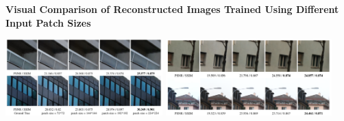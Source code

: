 \documentclass[landscape,a0paper,fontscale=0.292]{baposter}
\begin{document}
\begin{poster}
{    \vspace{0.2em}
    \textbf{Visual Comparison of Reconstructed Images Trained Using Different Input Patch Sizes}
    \vspace{-0.8em}
    \begin{center}
        \includegraphics[width=0.455\textwidth]{images/results}
        \includegraphics[width=0.48\textwidth]{images/results2}
    \end{center}

}
\end{poster}
\end{document}
